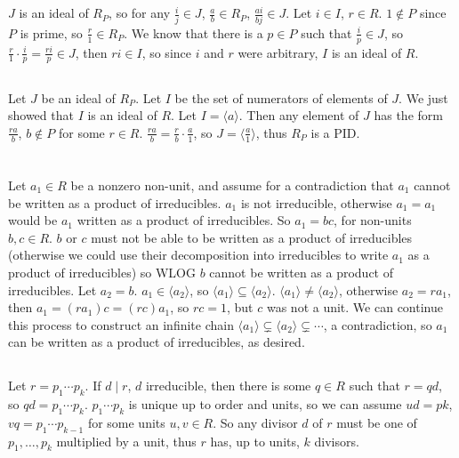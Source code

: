 \documentclass[11pt]{article}
\begin{document}
\subsection{} %
$J$ is an ideal of $R_P$, so for any $\frac{i}{j}\in J$, $\frac{a}{b}\in R_P$,
$\frac{ai}{bj}\in J$. Let $i\in I$, $r\in R$. $1\not\in P$ since $P$ is prime,
so $\frac{r}{1}\in R_P$. We know that there is a $p\in P$ such that
$\frac{i}{p}\in J$, so $\frac{r}{1}\cdot\frac{i}{p}=\frac{ri}{p}\in J$, then
$ri\in I$, so since $i$ and $r$ were arbitrary, $I$ is an ideal of $R$.


\subsection{} %
Let $J$ be an ideal of $R_P$. Let $I$ be the set of numerators of elements of
$J$. We just showed that $I$ is an ideal of $R$. Let $I=\langle a\rangle$.
Then any element of $J$ has the form $\frac{ra}{b}$, $b\not\in P$ for some
$r\in R$. $\frac{ra}{b}=\frac{r}{b}\cdot\frac{a}{1}$, so
$J=\langle\frac{a}{1}\rangle$, thus $R_P$ is a PID.


\section{} %
\subsection{} %
Let $a_1\in R$ be a nonzero non-unit, and assume for a contradiction that
$a_1$ cannot be written as a product of irreducibles. $a_1$ is not
irreducible, otherwise $a_1=a_1$ would be $a_1$ written as a product of
irreducibles. So $a_1=bc$, for non-units $b,c\in R$. $b$ or $c$ must not be
able to be written as a product of irreducibles (otherwise we could use their
decomposition into irreducibles to write $a_1$ as a product of irreducibles)
so WLOG $b$ cannot be written as a product of irreducibles. Let $a_2=b$.
$a_1\in\langle a_2\rangle$, so $\langle a_1\rangle\subseteq\langle
a_2\rangle$. $\langle a_1\rangle\neq\langle a_2\rangle$, otherwise $a_2=ra_1$,
then $a_1=(ra_1)c=(rc)a_1$, so $rc=1$, but $c$ was not a unit. We can continue
this process to construct an infinite chain $\langle
a_1\rangle\subsetneq\langle a_2\rangle\subsetneq\cdots$, a contradiction, so
$a_1$ can be written as a product of irreducibles, as desired.


\subsection{} %
Let $r=p_1\cdots p_k$. If $d\mid r$, $d$ irreducible, then there is some $q\in
R$ such that $r=qd$, so $qd=p_1\cdots p_k$. $p_1\cdots p_k$ is unique up to
order and units, so we can assume $ud=pk$, $vq=p_1\cdots p_{k-1}$ for some
units $u,v\in R$. So any divisor $d$ of $r$ must be one of $p_1,\ldots,p_k$
multiplied by a unit, thus $r$ has, up to units, $k$ divisors.
\end{document}
